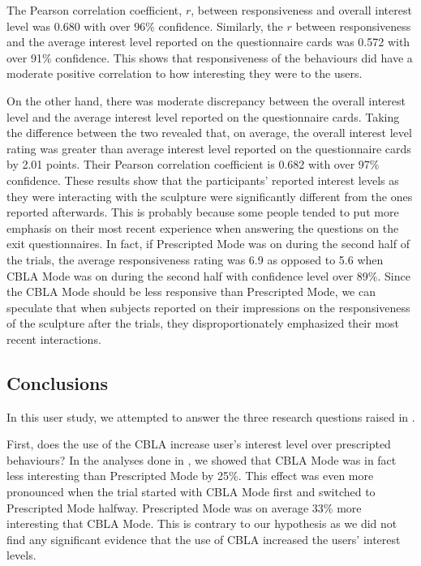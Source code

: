 The Pearson correlation coefficient, $r$, between responsiveness and overall interest level was 0.680 with over 96\% confidence. Similarly, the $r$ between responsiveness and the average interest level reported on the questionnaire cards was 0.572 with over 91\% confidence. This shows that responsiveness of the behaviours did have a moderate positive correlation to how interesting they were to the users.

On the other hand, there was moderate discrepancy between the overall interest level and the average interest level reported on the questionnaire cards. Taking the difference between the two revealed that, on average, the overall interest level rating was greater than average interest level reported on the questionnaire cards by 2.01 points. Their Pearson correlation coefficient is 0.682 with over 97\% confidence. These results show that the participants' reported interest levels as they were interacting with the sculpture were significantly different from the ones reported afterwards. This is probably because some people tended to put more emphasis on their most recent experience when answering the questions on the exit questionnaires. In fact, if Prescripted Mode was on during the second half of the trials, the average responsiveness rating was 6.9 as opposed to 5.6 when CBLA Mode was on during the second half with confidence level over 89\%. Since the CBLA Mode should be less responsive than Prescripted Mode, we can speculate that when subjects reported on their impressions on the responsiveness of the sculpture after the trials, they disproportionately emphasized their most recent interactions.


\subsection{Conclusions}

In this user study, we attempted to answer the three research questions raised in . 

First,  does the use of the CBLA increase user's interest level over prescripted behaviours?  In the analyses done in , we showed that CBLA Mode was in fact less interesting than Prescripted Mode by 25\%. This effect was even more pronounced when the trial started with CBLA Mode first and switched to Prescripted Mode halfway. Prescripted Mode was on average 33\% more interesting that CBLA Mode. This is contrary to our hypothesis as we did not find any significant evidence that the use of CBLA increased the users' interest levels.

